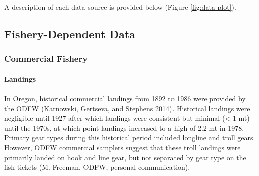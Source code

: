 \documentclass[11pt,
  english,
  a4paper,
]{article}
\begin{document}
A description of each data source is provided below (Figure \ref{fig:data-plot}).

\leavevmode\tagmcend\tagstructend\par


\hypertarget{fishery-dependent-data}{%
\subsection{Fishery-Dependent Data}\label{fishery-dependent-data}}

\leavevmode\tagmcend\tagstructend


\hypertarget{commercial-fishery}{%
\subsubsection{Commercial Fishery}\label{commercial-fishery}}

\leavevmode\tagmcend\tagstructend


\hypertarget{landings}{%
\paragraph{Landings}\label{landings}}

\leavevmode\tagmcend\tagstructend


In Oregon, historical commercial landings from 1892 to 1986 were provided by the ODFW {(Karnowski, Gertseva, and Stephens 2014)\leavevmode\tagmcend\tagstructend}. Historical landings were negligible until 1927 after which landings were consistent but minimal (\textless{} 1 mt) until the 1970s, at which point landings increased to a high of 2.2 mt in 1978. Primary gear types during this historical period included longline and troll gears. However, ODFW commercial samplers suggest that these troll landings were primarily landed on hook and line gear, but not separated by gear type on the fish tickets (M. Freeman, ODFW, personal communication).

\leavevmode\tagmcend\tagstructend\par

\end{document}
